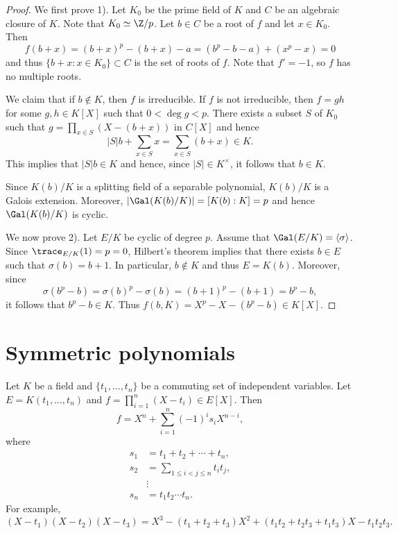 \begin{proof}
    We first prove 1). 
    Let $K_0$ be the prime field of $K$ and $C$ be an algebraic closure of $K$. Note that $K_0\simeq\Z/p$. 
    Let $b\in C$ be a root of $f$ and let $x\in K_0$. 
    Then
    \[
    f(b+x)=(b+x)^p-(b+x)-a
    =(b^p-b-a)+(x^p-x)=0
    \]
    and thus $\{b+x:x\in K_0\}\subset C$ is the set of roots of $f$. Note that 
    $f'=-1$, so $f$ has no multiple roots. 
    
    We claim that if $b\not\in K$, then $f$ is irreducible. If 
    $f$ is not irreducible, then 
    $f=gh$ for some $g,h\in K[X]$ such that $0<\deg g<p$. There exists
    a subset $S$ of $K_0$ such that 
    $g=\prod_{x\in S}(X-(b+x))$ in $C[X]$ and hence
    \[
    |S|b+\sum_{x\in S}x=\sum_{x\in S}(b+x)\in K.
    \]
    This implies that $|S|b\in K$ and hence, since 
    $|S|\in K^{\times}$, it follows that 
    $b\in K$.
    
    Since $K(b)/K$ is a splitting field of a separable polynomial, 
    $K(b)/K$ is a Galois extension. Moreover, 
    $|\Gal(K(b)/K)|=[K(b):K]=p$ and hence 
    $\Gal(K(b)/K)$ is cyclic. 
    
    We now prove 2). Let $E/K$ be cyclic of degree $p$. Assume
    that $\Gal(E/K)=\langle\sigma\rangle$. Since
    $\trace_{E/K}(1)=p=0$, Hilbert's theorem 
    implies that there exists $b\in E$ such that 
    $\sigma(b)=b+1$. In particular, $b\not\in K$
    and thus $E=K(b)$. Moreover, since 
    \[
    \sigma(b^p-b)=\sigma(b)^p-\sigma(b)=(b+1)^p-(b+1)=b^p-b, 
    \]
    it follows that $b^p-b\in K$. Thus 
    $f(b,K)=X^p-X-(b^p-b)\in K[X]$. 
\end{proof}

\section{Symmetric polynomials}

Let $K$ be a field and $\{t_1,\dots,t_n\}$ be a commuting set of  independent variables.  
Let $E=K(t_1,\dots,t_n)$ and $f=\prod_{i=1}^n(X-t_i)\in E[X]$. 
Then
\[
f=X^n+\sum_{i=1}^n (-1)^i s_i X^{n-i},
\]
where 
\begin{align*}
    s_1 &= t_1+t_2+\cdots+t_n,\\
    s_2 &= \sum_{1\leq i<j\leq n}t_it_j,\\
    &\vdots\\
    s_n &= t_1t_2\cdots t_n.
\end{align*}
For example, 
\[
(X-t_1)(X-t_2)(X-t_3)=X^3-(t_1+t_2+t_3)X^2+(t_1t_2+t_2t_3+t_1t_3)X-t_1t_2t_3.
\]

